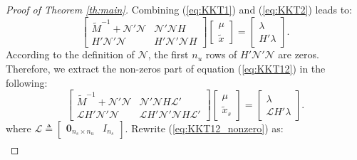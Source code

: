 \documentclass[12pt]{article}  %
\newcommand{\Nc}{{\mathcal{N}}}
\newcommand{\Lc}{{\mathcal{L}}}
\newtheorem*{proof}{\textbf{Proof}}
\begin{document}
\begin{proof}[Proof of Theorem \ref{th:main}]
	Combining (\ref{eq:KKT1}) and (\ref{eq:KKT2}) leads to:
	\begin{equation}\label{eq:KKT12}
	\begin{bmatrix}
	\tilde{M}^{-1}+\Nc{'}\Nc & \Nc{'} \Nc H\\
	H{'} \Nc{'} \Nc  & H{'} \Nc{'} \Nc H
	\end{bmatrix}
	\begin{bmatrix}
	\mu \\ \tilde{x}
	\end{bmatrix}=
	\begin{bmatrix}
	\lambda \\ H{'} \lambda 
	\end{bmatrix}.
	\end{equation}
	According to the definition of $\Nc$, the first $n_u$ rows of $H{'} \Nc{'} \Nc$ are zeros. Therefore, we extract the non-zeros part of equation (\ref{eq:KKT12}) in the following:
	\begin{equation}\label{eq:KKT12_nonzero}
	\begin{bmatrix}
	\tilde{M}^{-1}+\Nc{'}\Nc & \Nc{'} \Nc H \Lc{'}\\
	\Lc H{'} \Nc{'} \Nc  &  \Lc H{'} \Nc{'} \Nc H \Lc{'}
	\end{bmatrix}
	\begin{bmatrix}
	\mu \\ \tilde{x}_s
	\end{bmatrix}=
	\begin{bmatrix}
	\lambda \\ \Lc H{'} \lambda 
	\end{bmatrix}.
	\end{equation}
	where $\Lc\triangleq 
	\begin{bmatrix}
	\mathbf{0}_{n_s\times n_u} & I_{n_s}
	\end{bmatrix}.
	$
	Rewrite (\ref{eq:KKT12_nonzero}) as:
	\begin{align}\label{eq:KKT12_matrix}

\end{align}
\end{proof}
\end{document}
